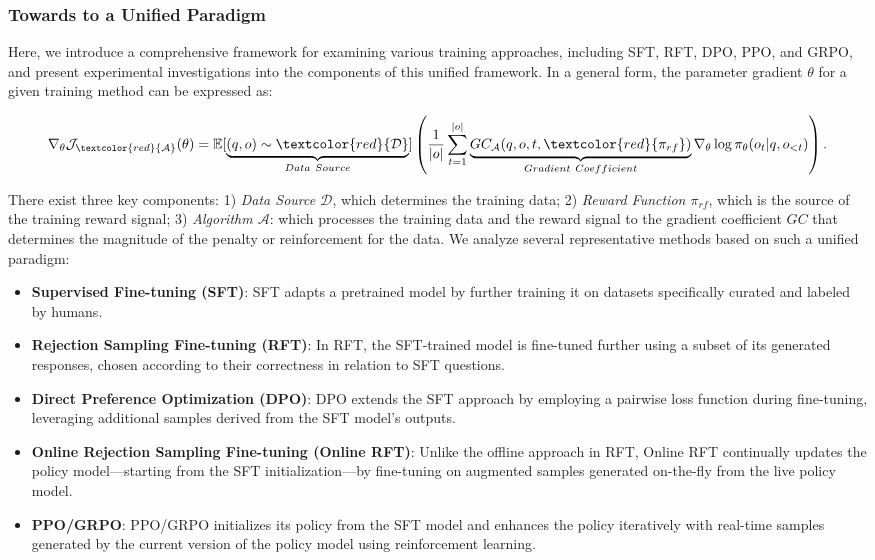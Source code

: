 \begin{itemize}[topsep=0pt]
\begin{itemize}[topsep=0pt]
\subsubsection{Towards to a Unified Paradigm} Here, we introduce a comprehensive framework for examining various training approaches, including SFT, RFT, DPO, PPO, and GRPO, and present experimental investigations into the components of this unified framework. In a general form, the parameter gradient $\theta$ for a given training method can be expressed as:

\begin{equation}
    \nabla_{\theta}\mathcal{J}_{\textcolor{red}{\mathcal{A}}}(\theta) = \mathbb{E}[\underbrace{(q,o) \sim \textcolor{red}{\mathcal{D}}}_{Data \ Source}]\left( \frac{1}{|o|} \sum_{t=1}^{|o|}  \underbrace{GC_{{\mathcal{A}}}(q, o, t, \textcolor{red}{\pi_{{rf}}})}_{Gradient \ Coefficient}  \nabla_{\theta}\log \pi_{\theta}(o_t | q, o_{<t})\right).
\label{eq:objective}
\end{equation}

There exist three key components: 1) \textit{Data Source $\mathcal{D}$}, which determines the training data; 2) \textit{Reward Function $\pi_{{rf}}$}, which is the source of the training reward signal; 3) \textit{Algorithm $\mathcal{A}$}: which processes the training data and the reward signal to the gradient coefficient $GC$ that determines the magnitude of the penalty or reinforcement for the data. We analyze several representative methods based on such a unified paradigm:

\begin{itemize}
    \item \textbf{Supervised Fine-tuning (SFT)}: SFT adapts a pretrained model by further training it on datasets specifically curated and labeled by humans.
    \item \textbf{Rejection Sampling Fine-tuning (RFT)}: In RFT, the SFT-trained model is fine-tuned further using a subset of its generated responses, chosen according to their correctness in relation to SFT questions.
    \item \textbf{Direct Preference Optimization (DPO)}: DPO extends the SFT approach by employing a pairwise loss function during fine-tuning, leveraging additional samples derived from the SFT model’s outputs.
    \item \textbf{Online Rejection Sampling Fine-tuning (Online RFT)}: Unlike the offline approach in RFT, Online RFT continually updates the policy model—starting from the SFT initialization—by fine-tuning on augmented samples generated on-the-fly from the live policy model.
    \item \textbf{PPO/GRPO}: PPO/GRPO initializes its policy from the SFT model and enhances the policy iteratively with real-time samples generated by the current version of the policy model using reinforcement learning.
\end{itemize}


\end{itemize}
\end{itemize}
